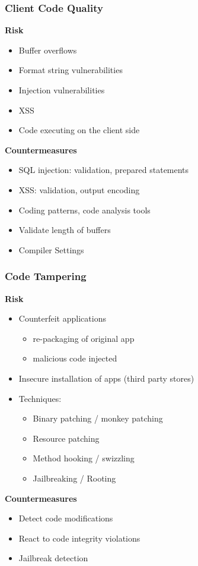 \subsubsection{Client Code Quality}
\textbf{Risk}
\begin{itemize}
    \item Buffer overflows
    \item Format string vulnerabilities
    \item Injection vulnerabilities
    \item XSS
    \item Code executing on the client side
\end{itemize}
\textbf{Countermeasures}
\begin{itemize}
    \item SQL injection: validation, prepared statements
    \item XSS: validation, output encoding
    \item Coding patterns, code analysis tools
    \item Validate length of buffers
    \item Compiler Settings
\end{itemize}

\subsubsection{Code Tampering}
\textbf{Risk}
\begin{itemize}
    \item Counterfeit applications
    \begin{itemize}
        \item re-packaging of original app
        \item malicious code injected
    \end{itemize}
    \item Insecure installation of apps (third party stores)
    \item Techniques:
    \begin{itemize}
        \item Binary patching / monkey patching
        \item Resource patching
        \item Method hooking / swizzling
        \item Jailbreaking / Rooting
    \end{itemize}
\end{itemize}
\textbf{Countermeasures}
\begin{itemize}
    \item Detect code modifications
    \item React to code integrity violations
    \item Jailbreak detection
\end{itemize}

